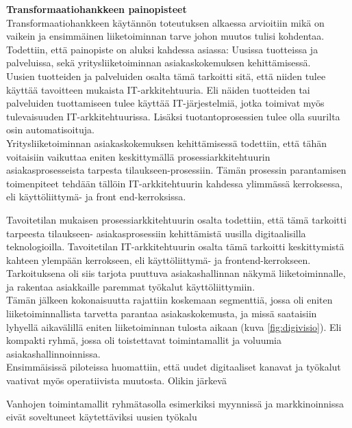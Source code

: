 \documentclass[finnish,12pt,a4paper,pdftex]{article}
\begin{document}
\textbf{Transformaatiohankkeen painopisteet}\\

Transformaatiohankkeen käytännön toteutuksen alkaessa arvioitiin mikä on vaikein ja ensimmäinen liiketoiminnan tarve johon muutos tulisi kohdentaa. Todettiin, että painopiste on aluksi kahdessa asiassa: Uusissa tuotteissa ja palveluissa, sekä yritysliiketoiminnan asiakaskokemuksen kehittämisessä.\\

Uusien tuotteiden ja palveluiden osalta tämä tarkoitti sitä, että niiden tulee käyttää tavoitteen mukaista IT-arkkitehtuuria. Eli näiden tuotteiden tai palveluiden tuottamiseen tulee käyttää IT-järjestelmiä, jotka toimivat myös tulevaisuuden IT-arkkitehtuurissa. Lisäksi tuotantoprosessien tulee olla suurilta osin automatisoituja.\\

Yritysliiketoiminnan asiakaskokemuksen kehittämisessä todettiin, että tähän voitaisiin vaikuttaa eniten keskittymällä prosessiarkkitehtuurin asiakasprosesseista tarpesta tilaukseen-prosessiin. Tämän prosessin parantamisen toimenpiteet tehdään tällöin IT-arkkitehtuurin kahdessa ylimmässä kerroksessa, eli käyttöliittymä- ja front end-kerroksissa.

Tavoitetilan mukaisen prosessiarkkitehtuurin osalta todettiin, että tämä tarkoitti tarpeesta tilaukseen- asiakasprosessiin kehittämistä uusilla digitaalisilla teknologioilla. Tavoitetilan IT-arkkitehtuurin osalta tämä tarkoitti keskittymistä kahteen ylempään kerrokseen, eli käyttöliittymä- ja frontend-kerrokseen. Tarkoituksena oli siis tarjota puuttuva asiakashallinnan näkymä liiketoiminnalle, ja rakentaa asiakkaille paremmat työkalut käyttöliittymiin.\\

Tämän jälkeen kokonaisuutta rajattiin koskemaan segmenttiä, jossa oli eniten liiketoiminnallista tarvetta parantaa asiakaskokemusta, ja missä saataisiin lyhyellä aikavälillä eniten liiketoiminnan tulosta aikaan (kuva \ref{fig:digivisio}). Eli kompakti ryhmä, jossa oli toistettavat toimintamallit ja voluumia asiakashallinnoinnissa.\\

Ensimmäisissä piloteissa huomattiin, että uudet digitaaliset kanavat ja työkalut vaativat myös operatiivista muutosta. Olikin järkevä 

Vanhojen toimintamallit ryhmätasolla esimerkiksi myynnissä ja markkinoinnissa eivät soveltuneet käytettäviksi uusien työkalu
\end{document}
